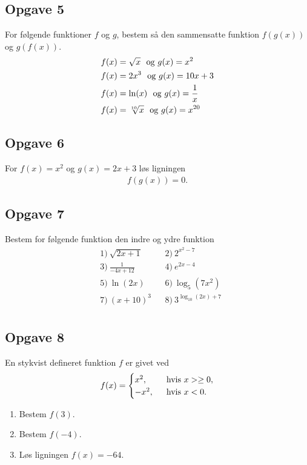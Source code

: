 \subsection*{Opgave 5}
For følgende funktioner $f$ og $g$, bestem så den sammensatte funktion $f(g(x))$ og $g(f(x))$.
\begin{align*}
&f(x) = \sqrt{x}\  \textnormal{ og } g(x) = x^2\\
&f(x) = 2x^3\  \textnormal{ og } g(x) = 10x+3\\
&f(x) = \ln(x)\  \textnormal{ og } g(x) = \frac{1}{x}\\
&f(x) = \sqrt[10]{x}\  \textnormal{ og } g(x) = x^{20}
\end{align*}
\subsection*{Opgave 6}
For $f(x) = x^2$ og $g(x)=2x+3$ løs ligningen
\begin{align*}
f(g(x)) = 0.
\end{align*}

\subsection*{Opgave 7}
Bestem for følgende funktion den indre og ydre funktion
\begin{align*}
	&1) \ \sqrt{2x+1}   &&2) \  2^{x^2-7}     \\
	&3) \ \frac{1}{-4x+12}   &&4) \ e^{2x-4}      \\
	&5) \ \ln(2x)   &&6) \  \log_5(7x^2)     \\
	&7) \ (x+10)^3   &&8) \  3^{\log_{10}(2x)+7}       \\
\end{align*}


\subsection*{Opgave 8}
En stykvist defineret funktion $f$ er givet ved
\begin{align*}
	f(x) = 
	\begin{cases}
		x^2, \ &\textnormal{ hvis } x > \geq 0,\\
		-x^2, \ &\textnormal{ hvis } x < 0.
	\end{cases}
\end{align*}
\begin{enumerate}[label=\roman*)]
	\item Bestem $f(3).$
	\item Bestem $f(-4).$
	\item Løs ligningen $f(x) = -64$.
\end{enumerate}

